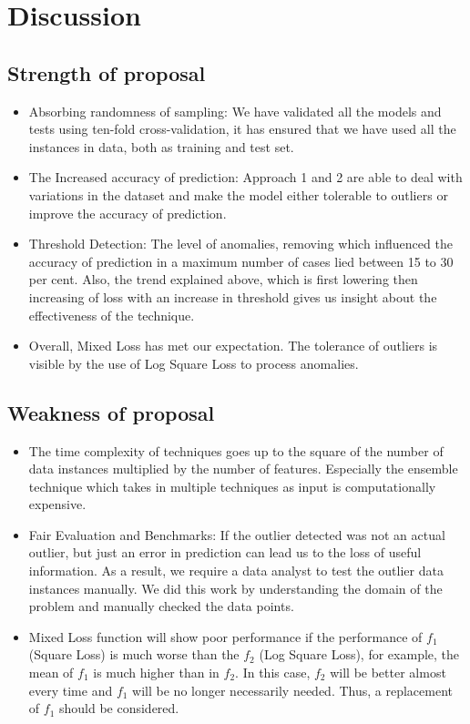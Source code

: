 \documentclass[runningheads]{llncs}
\begin{document}
\section{Discussion}
\subsection{Strength of proposal}
\begin{itemize}
    \item Absorbing randomness of sampling: We have validated all the models and tests using ten-fold cross-validation, it has ensured that we have used all the instances in data, both as training and test set.
    \item The Increased accuracy of prediction: Approach 1 and 2 are able to deal with variations in the dataset and make the model either tolerable to outliers or improve the accuracy of prediction.
    \item Threshold Detection: The level of anomalies, removing which influenced the accuracy of prediction in a maximum number of cases lied between 15 to 30 per cent. Also, the trend explained above, which is first lowering then increasing of loss with an increase in threshold gives us insight about the effectiveness of the technique.
    \item Overall, Mixed Loss has met our expectation. The tolerance of outliers is visible by the use of Log Square Loss to process anomalies.
\end{itemize}


\subsection{Weakness of proposal}
\begin{itemize}
    \item The time complexity of techniques goes up to the square of the number of data instances multiplied by the number of features. Especially the ensemble technique which takes in multiple techniques as input is computationally expensive.
    \item Fair Evaluation and Benchmarks: If the outlier detected was not an actual outlier, but just an error in prediction can lead us to the loss of useful information. As a result, we require a data analyst to test the outlier data instances manually. We did this work by understanding the domain of the problem and manually checked the data points.
    \item Mixed Loss function will show poor performance if the performance of $f_1$ (Square Loss) is much worse than the $f_2$ (Log Square Loss), for example, the mean of $f_1$ is much higher than in $f_2$. In this case, $f_2$ will be better almost every time and $f_1$ will be no longer necessarily needed. Thus, a replacement of $f_1$ should be considered.
\end{itemize}
\end{document}
